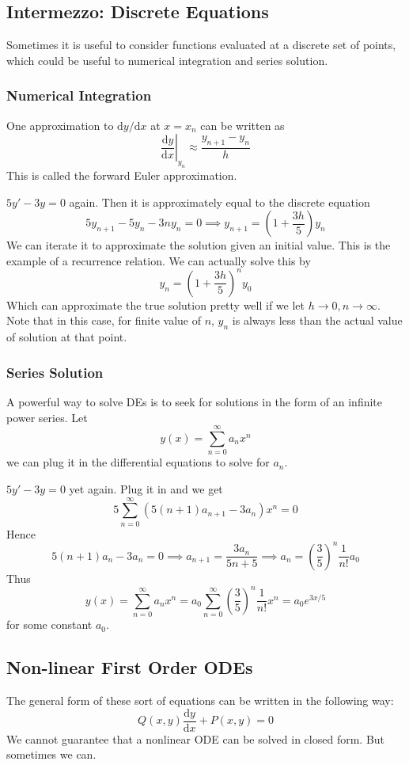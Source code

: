 \subsection{Intermezzo: Discrete Equations}
Sometimes it is useful to consider functions evaluated at a discrete set of points, which could be useful to numerical integration and series solution.
\subsubsection{Numerical Integration}
One approximation to $\mathrm dy/\mathrm dx$ at $x=x_n$ can be written as
$$\left.\frac{\mathrm dy}{\mathrm dx}\right|_{y_n}\approx \frac{y_{n+1}-y_n}{h}$$
This is called the forward Euler approximation.
\begin{example}
    $5y'-3y=0$ again.
    Then it is approximately equal to the discrete equation
    $$5y_{n+1}-5y_n-3ny_n=0\implies y_{n+1}=\left(1+\frac{3h}{5}\right)y_n$$
    We can iterate it to approximate the solution given an initial value.
    This is the example of a recurrence relation.
    We can actually solve this by
    $$y_{n}=\left(1+\frac{3h}{5}\right)^ny_0$$
    Which can approximate the true solution pretty well if we let $h\to 0,n\to\infty$.
    Note that in this case, for finite value of $n$, $y_n$ is always less than the actual value of solution at that point.
\end{example}
\subsubsection{Series Solution}
A powerful way to solve DEs is to seek for solutions in the form of an infinite power series.
Let
$$y(x)=\sum_{n=0}^\infty a_nx^n$$
we can plug it in the differential equations to solve for $a_n$.
\begin{example}
    $5y'-3y=0$ yet again.
    Plug it in and we get
    $$5\sum_{n=0}^\infty (5(n+1)a_{n+1}-3a_n)x^{n}=0$$
    Hence
    $$5(n+1)a_n-3a_n=0\implies a_{n+1}=\frac{3a_n}{5n+5}\implies a_n=\left(\frac{3}{5}\right)^n\frac{1}{n!}a_0$$
    Thus
    $$y(x)=\sum_{n=0}^\infty a_nx^n=a_0\sum_{n=0}^\infty \left(\frac{3}{5}\right)^n\frac{1}{n!}x^n=a_0e^{3x/5}$$
    for some constant $a_0$.
\end{example}
\subsection{Non-linear First Order ODEs}
The general form of these sort of equations can be written in the following way:
$$Q(x,y)\frac{\mathrm dy}{\mathrm dx}+P(x,y)=0$$
We cannot guarantee that a nonlinear ODE can be solved in closed form.
But sometimes we can.
